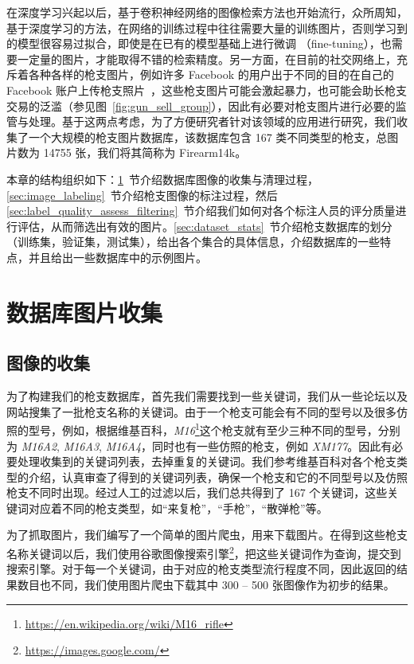 在深度学习兴起以后，基于卷积神经网络的图像检索方法也开始流行，众所周知，基于深度学习的方法，在网络的训练过程中往往需要大量的训练图片，否则学习到的模型很容易过拟合，即使是在已有的模型基础上进行微调 （fine-tuning），也需要一定量的图片，才能取得不错的检索精度。另一方面，在目前的社交网络上，充斥着各种各样的枪支图片，例如许多 Facebook 的用户出于不同的目的在自己的 Facebook 账户上传枪支照片~\cite{Drange2016,MELE2016FacebookBG}，这些枪支图片可能会激起暴力，也可能会助长枪支交易的泛滥（参见图~\ref{fig:gun_sell_group}），因此有必要对枪支图片进行必要的监管与处理。基于这两点考虑，为了方便研究者针对该领域的应用进行研究，我们收集了一个大规模的枪支图片数据库，该数据库包含 167 类不同类型的枪支，总图片数为 14755 张，我们将其简称为 Firearm14k。

本章的结构组织如下：\ref{sec:image_collect_clean}~节介绍数据库图像的收集与清理过程，\ref{sec:image_labeling}~节介绍枪支图像的标注过程，然后 \ref{sec:label_quality_assess_filtering}~节介绍我们如何对各个标注人员的评分质量进行评估，从而筛选出有效的图片。\ref{sec:dataset_stats}~节介绍枪支数据库的划分（训练集，验证集，测试集），给出各个集合的具体信息，介绍数据库的一些特点，并且给出一些数据库中的示例图片。


\section{数据库图片收集}\label{sec:image_collect_clean}

\subsection{图像的收集}
为了构建我们的枪支数据库，首先我们需要找到一些关键词，我们从一些论坛以及网站搜集了一批枪支名称的关键词。由于一个枪支可能会有不同的型号以及很多仿照的型号，例如，根据维基百科，\emph{M16}\footnote{\url{https://en.wikipedia.org/wiki/M16_rifle}}这个枪支就有至少三种不同的型号，分别为 \emph{M16A2}, \emph{M16A3}, \emph{M16A4}，同时也有一些仿照的枪支，例如 \emph{XM177}。因此有必要处理收集到的关键词列表，去掉重复的关键词。我们参考维基百科对各个枪支类型的介绍，认真审查了得到的关键词列表，确保一个枪支和它的不同型号以及仿照枪支不同时出现。经过人工的过滤以后，我们总共得到了 167 个关键词，这些关键词对应着不同的枪支类型，如“来复枪”，“手枪”，“散弹枪”等。

为了抓取图片，我们编写了一个简单的图片爬虫，用来下载图片。在得到这些枪支名称关键词以后，我们使用谷歌图像搜索引擎\footnote{\url{https://images.google.com/}}，把这些关键词作为查询，提交到搜索引擎。对于每一个关键词，由于对应的枪支类型流行程度不同，因此返回的结果数目也不同，我们使用图片爬虫下载其中 300 -- 500 张图像作为初步的结果。

